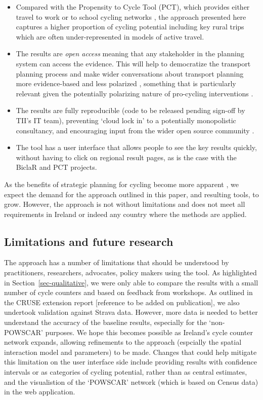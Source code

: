 \documentclass[
  super,
  preprint,
  3p]{elsarticle}
\providecommand{\tightlist}{%
  \setlength{\itemsep}{0pt}\setlength{\parskip}{0pt}}\usepackage{longtable,booktabs,array}
\begin{document}
\begin{itemize}
\tightlist
\item
  Compared with the Propensity to Cycle Tool (PCT), which provides
  either travel to work \citep{lovelace2017} or to school cycling
  networks \citep{goodman2019}, the approach presented here captures a
  higher proportion of cycling potential including key rural trips which
  are often under-represented in models of active travel.
\item
  The results are \emph{open access} meaning that any stakeholder in the
  planning system can access the evidence. This will help to democratize
  the transport planning process and make wider conversations about
  transport planning more evidence-based and less polarized
  \citep{lovelace2020}, something that is particularly relevant given
  the potentially polarizing nature of pro-cycling interventions
  \citep{wild2017}.
\item
  The results are fully reproducible (code to be released pending
  sign-off by TII's IT team), preventing `cloud lock in' to a
  potentially monopolistic consultancy, and encouraging input from the
  wider open source community \citep{lovelace2021, dhir2017}.
\item
  The tool has a user interface that allows people to see the key
  results quickly, without having to click on regional result pages, as
  is the case with the BiclaR and PCT projects.
\end{itemize}

As the benefits of strategic planning for cycling become more apparent
\citep{scappini2022}, we expect the demand for the approach outlined in
this paper, and resulting tools, to grow. However, the approach is not
without limitations and does not meet all requirements in Ireland or
indeed any country where the methods are applied.

\subsection{Limitations and future
research}\label{limitations-and-future-research}

The approach has a number of limitations that should be understood by
practitioners, researchers, advocates, policy makers using the tool. As
highlighted in Section~\ref{sec-qualitative}, we were only able to
compare the results with a small number of cycle counters and based on
feedback from workshops. As outlined in the CRUSE extension report
{[}reference to be added on publication{]}, we also undertook validation
against Strava data. However, more data is needed to better understand
the accuracy of the baseline results, especially for the `non-POWSCAR'
purposes. We hope this becomes possible as Ireland's cycle counter
network expands, allowing refinements to the approach (espcially the
spatial interaction model and parameters) to be made. Changes that could
help mitigate this limitation on the user interface side include
providing results with confidence intervals or as categories of cycling
potential, rather than as central estimates, and the visualistion of the
`POWSCAR' network (which is based on Census data) in the web
application.
\end{document}
